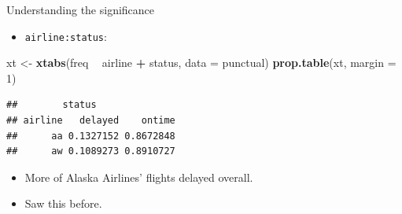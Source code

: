 \documentclass[ignorenonframetext,]{beamer}
\newenvironment{Shaded}{\begin{snugshade}}{\end{snugshade}}
\newcommand{\DataTypeTok}[1]{\textcolor[rgb]{0.13,0.29,0.53}{#1}}
\newcommand{\DecValTok}[1]{\textcolor[rgb]{0.00,0.00,0.81}{#1}}
\newcommand{\KeywordTok}[1]{\textcolor[rgb]{0.13,0.29,0.53}{\textbf{#1}}}
\newcommand{\NormalTok}[1]{#1}
\newcommand{\OperatorTok}[1]{\textcolor[rgb]{0.81,0.36,0.00}{\textbf{#1}}}
\newcommand{\StringTok}[1]{\textcolor[rgb]{0.31,0.60,0.02}{#1}}
\providecommand{\tightlist}{%
  \setlength{\itemsep}{0pt}\setlength{\parskip}{0pt}}
\begin{document}
\begin{frame}[fragile]{Understanding the significance}
\protect\hypertarget{understanding-the-significance}{}

\begin{itemize}
\tightlist
\item
  \texttt{airline:status}:
\end{itemize}

\begin{Shaded}
\begin{Highlighting}[]
\NormalTok{xt <-}\StringTok{ }\KeywordTok{xtabs}\NormalTok{(freq }\OperatorTok{~}\StringTok{ }\NormalTok{airline }\OperatorTok{+}\StringTok{ }\NormalTok{status, }\DataTypeTok{data =}\NormalTok{ punctual)}
\KeywordTok{prop.table}\NormalTok{(xt, }\DataTypeTok{margin =} \DecValTok{1}\NormalTok{)}
\end{Highlighting}
\end{Shaded}

\begin{verbatim}
##        status
## airline   delayed    ontime
##      aa 0.1327152 0.8672848
##      aw 0.1089273 0.8910727
\end{verbatim}

\begin{itemize}
\item
  More of Alaska Airlines' flights delayed overall.
\item
  Saw this before.
\end{itemize}

\end{frame}
\end{document}
